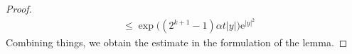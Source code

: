 \documentclass{amsart}
\theoremstyle{remark}
\renewcommand{\leq}{\leqslant}
\renewcommand{\leq}{\leqslant}
\newcommand{\e}{\mathrm{e}} %
\renewcommand{\leq}{\leqslant}%
\newcommand{\red}{\color{red}}
\begin{document}
\begin{proof}
\begin{align*}
    & \leq \exp\bigl((2^{k + 1} - 1) \alpha t |y| \bigr) \e^{|y|^2}
   \end{align*}
  Combining things, we obtain the estimate in the formulation of the lemma.  
\end{proof}
\end{document}
